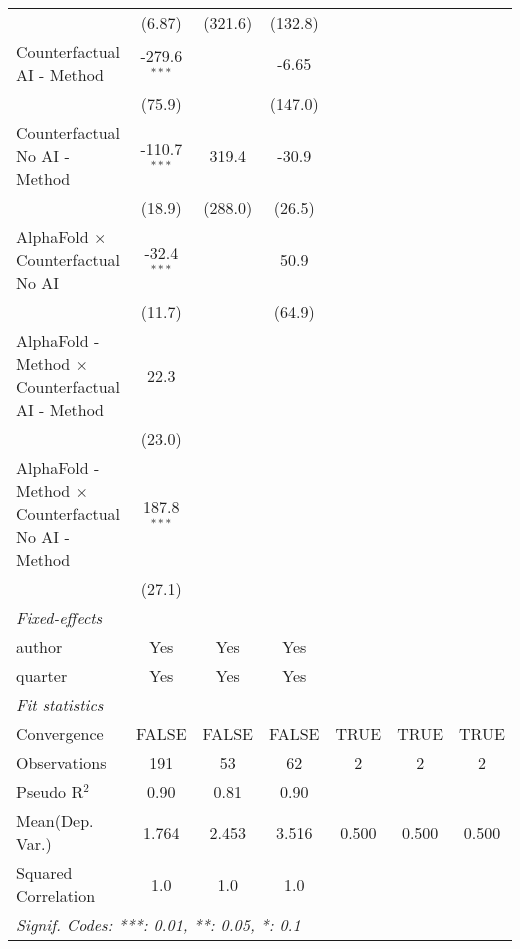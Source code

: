 \begin{tabular}{lcccccc}
                                                              & (6.87)         & (321.6)        & (132.8) &      &      &   \\   
   Counterfactual AI - Method                                 & -279.6$^{***}$ &                & -6.65   &      &      &   \\   
                                                              & (75.9)         &                & (147.0) &      &      &   \\   
   Counterfactual No AI - Method                              & -110.7$^{***}$ & 319.4          & -30.9   &      &      &   \\   
                                                              & (18.9)         & (288.0)        & (26.5)  &      &      &   \\   
   AlphaFold $\times$ Counterfactual No AI                    & -32.4$^{***}$  &                & 50.9    &      &      &   \\   
                                                              & (11.7)         &                & (64.9)  &      &      &   \\   
   AlphaFold - Method $\times$ Counterfactual AI - Method     & 22.3           &                &         &      &      &   \\   
                                                              & (23.0)         &                &         &      &      &   \\   
   AlphaFold - Method $\times$ Counterfactual No AI - Method  & 187.8$^{***}$  &                &         &      &      &   \\   
                                                              & (27.1)         &                &         &      &      &   \\   
   \midrule
   \emph{Fixed-effects}\\
   author                                                     & Yes            & Yes            & Yes     &      &      & \\  
   quarter                                                    & Yes            & Yes            & Yes     &      &      & \\  
   \midrule
   \emph{Fit statistics}\\
   Convergence                                                &FALSE           & FALSE          & FALSE   & TRUE & TRUE & TRUE\\  
   Observations                                               & 191            & 53             & 62      & 2    & 2    & 2\\  
   Pseudo R$^2$                                               & 0.90           & 0.81           & 0.90    &      &      & \\  
Mean(Dep. Var.) & 1.764 & 2.453 & 3.516 & 0.500 & 0.500 & 0.500 \\
   Squared Correlation                                        & 1.0            & 1.0            & 1.0     &      &      & \\  
   \midrule \midrule
   \multicolumn{7}{l}{\emph{Signif. Codes: ***: 0.01, **: 0.05, *: 0.1}}\\
\end{tabular}
\par\endgroup
